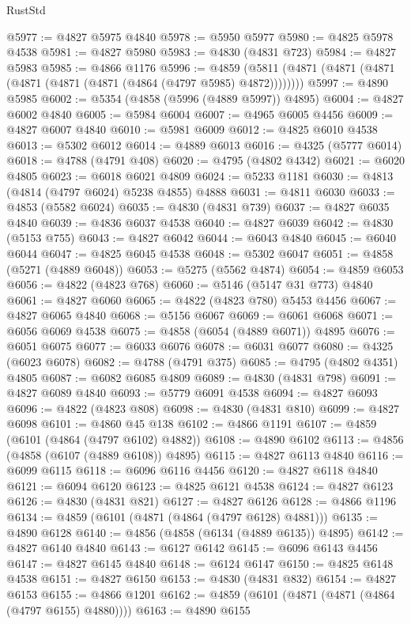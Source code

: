 \begin{lexlean}{RustStd}
\begin{coremodule}
@5977 := @4827 @5975 @4840
@5978 := @5950 @5977
@5980 := @4825 @5978 @4538
@5981 := @4827 @5980
@5983 := @4830 (@4831 @723)
@5984 := @4827 @5983
@5985 := @4866 @1176
@5996 := @4859 (@5811 (@4871 (@4871 (@4871 (@4871 (@4871 (@4871 (@4864 (@4797 @5985) @4872))))))))
@5997 := @4890 @5985
@6002 := @5354 (@4858 (@5996 (@4889 @5997)) @4895)
@6004 := @4827 @6002 @4840
@6005 := @5984 @6004
@6007 := @4965 @6005 @4456
@6009 := @4827 @6007 @4840
@6010 := @5981 @6009
@6012 := @4825 @6010 @4538
@6013 := @5302 @6012
@6014 := @4889 @6013
@6016 := @4325 (@5777 @6014)
@6018 := @4788 (@4791 @408)
@6020 := @4795 (@4802 @4342)
@6021 := @6020 @4805
@6023 := @6018 @6021 @4809
@6024 := @5233 @1181
@6030 := @4813 (@4814 (@4797 @6024) @5238 @4855) @4888
@6031 := @4811 @6030
@6033 := @4853 (@5582 @6024)
@6035 := @4830 (@4831 @739)
@6037 := @4827 @6035 @4840
@6039 := @4836 @6037 @4538
@6040 := @4827 @6039
@6042 := @4830 (@5153 @755)
@6043 := @4827 @6042
@6044 := @6043 @4840
@6045 := @6040 @6044
@6047 := @4825 @6045 @4538
@6048 := @5302 @6047
@6051 := @4858 (@5271 (@4889 @6048))
@6053 := @5275 (@5562 @4874)
@6054 := @4859 @6053
@6056 := @4822 (@4823 @768)
@6060 := @5146 (@5147 @31 @773) @4840
@6061 := @4827 @6060
@6065 := @4822 (@4823 @780) @5453 @4456
@6067 := @4827 @6065 @4840
@6068 := @5156 @6067
@6069 := @6061 @6068
@6071 := @6056 @6069 @4538
@6075 := @4858 (@6054 (@4889 @6071)) @4895
@6076 := @6051 @6075
@6077 := @6033 @6076
@6078 := @6031 @6077
@6080 := @4325 (@6023 @6078)
@6082 := @4788 (@4791 @375)
@6085 := @4795 (@4802 @4351) @4805
@6087 := @6082 @6085 @4809
@6089 := @4830 (@4831 @798)
@6091 := @4827 @6089 @4840
@6093 := @5779 @6091 @4538
@6094 := @4827 @6093
@6096 := @4822 (@4823 @808)
@6098 := @4830 (@4831 @810)
@6099 := @4827 @6098
@6101 := @4860 @45 @138
@6102 := @4866 @1191
@6107 := @4859 (@6101 (@4864 (@4797 @6102) @4882))
@6108 := @4890 @6102
@6113 := @4856 (@4858 (@6107 (@4889 @6108)) @4895)
@6115 := @4827 @6113 @4840
@6116 := @6099 @6115
@6118 := @6096 @6116 @4456
@6120 := @4827 @6118 @4840
@6121 := @6094 @6120
@6123 := @4825 @6121 @4538
@6124 := @4827 @6123
@6126 := @4830 (@4831 @821)
@6127 := @4827 @6126
@6128 := @4866 @1196
@6134 := @4859 (@6101 (@4871 (@4864 (@4797 @6128) @4881)))
@6135 := @4890 @6128
@6140 := @4856 (@4858 (@6134 (@4889 @6135)) @4895)
@6142 := @4827 @6140 @4840
@6143 := @6127 @6142
@6145 := @6096 @6143 @4456
@6147 := @4827 @6145 @4840
@6148 := @6124 @6147
@6150 := @4825 @6148 @4538
@6151 := @4827 @6150
@6153 := @4830 (@4831 @832)
@6154 := @4827 @6153
@6155 := @4866 @1201
@6162 := @4859 (@6101 (@4871 (@4871 (@4864 (@4797 @6155) @4880))))
@6163 := @4890 @6155

\end{coremodule}
\end{lexlean}
